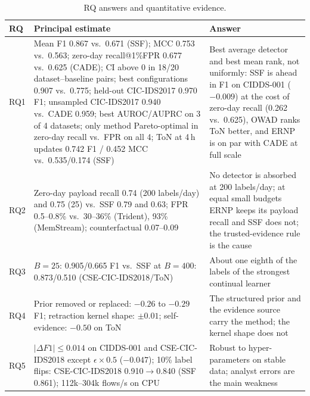 \documentclass[a4paper,fleqn]{cas-dc}
\newcommand{\ERNP}{ERNP\xspace}
\begin{document}
\begin{table}[t]
\centering
\caption{RQ answers and quantitative evidence.}
\label{tab:answers}
\scriptsize
\setlength{\tabcolsep}{3pt}
\begin{tabularx}{\textwidth}{L{0.16}L{1.52}L{1.32}}
\toprule
RQ & Principal estimate & Answer \\
\midrule
RQ1 & Mean F1 0.867 vs.\ 0.671 (SSF); MCC 0.753 vs.\ 0.563; zero-day recall@1\%FPR 0.677 vs.\ 0.625 (CADE); CI above 0 in 18/20 dataset--baseline pairs; best configurations 0.907 vs.\ 0.775; held-out CIC-IDS2017 0.970 F1; unsampled CIC-IDS2017 0.940 vs.\ CADE 0.959; best AUROC/AUPRC on 3 of 4 datasets; only method Pareto-optimal in zero-day recall vs.\ FPR on all 4; ToN at 4\,h updates 0.742 F1 / 0.452 MCC vs.\ 0.535/0.174 (SSF) & Best average detector and best mean rank, not uniformly: SSF is ahead in F1 on CIDDS-001 ($-0.009$) at the cost of zero-day recall (0.262 vs.\ 0.625), OWAD ranks ToN better, and \ERNP is on par with CADE at full scale \\
RQ2 & Zero-day payload recall 0.74 (200 labels/day) and 0.75 (25) vs.\ SSF 0.79 and 0.63; FPR 0.5--0.8\% vs.\ 30--36\% (Trident), 93\% (MemStream); counterfactual 0.07--0.09 & No detector is absorbed at 200 labels/day; at equal small budgets \ERNP keeps its payload recall and SSF does not; the trusted-evidence rule is the cause \\
RQ3 & $B=25$: 0.905/0.665 F1 vs.\ SSF at $B=400$: 0.873/0.510 (CSE-CIC-IDS2018/ToN) & About one eighth of the labels of the strongest continual learner \\
RQ4 & Prior removed or replaced: $-0.26$ to $-0.29$ F1; retraction kernel shape: $\pm0.01$; self-evidence: $-0.50$ on ToN & The structured prior and the evidence source carry the method; the kernel shape does not \\
RQ5 & $|\Delta F1|\le0.014$ on CIDDS-001 and CSE-CIC-IDS2018 except $\epsilon\times0.5$ ($-0.047$); 10\% label flips: CSE-CIC-IDS2018 0.910$\rightarrow$0.840 (SSF 0.861); 112k--304k flows/s on CPU & Robust to hyper-parameters on stable data; analyst errors are the main weakness \\
\bottomrule
\end{tabularx}
\end{table}
\end{document}
